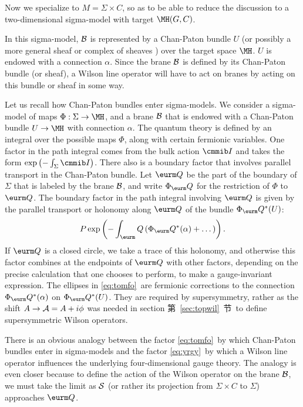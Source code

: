 Now we specialize to $M=\Sigma\times C$, so as to be able to
reduce the discussion to a two-dimensional sigma-model with target
$\MH(G,C)$. 
 
 In this  sigma-model, ${\cal
B}$ is represented by a Chan-Paton bundle $U$ (or possibly a more
general sheaf or complex of sheaves \cite{ref103,ref104}) over
the target space $\MH$. $U$ is endowed with a connection $\alpha$.
Since the brane ${\cal B}$ is defined by its Chan-Paton bundle (or
sheaf), a Wilson line operator will have to act on branes by
acting on this bundle or sheaf in some way.

\def\QQ{\eurm Q}

 Let us recall how Chan-Paton bundles enter sigma-models.  We
consider a sigma-model of maps $\Phi:\Sigma\to \MH$, and a brane
${\cal B}$ that is endowed with a Chan-Paton bundle $U\to \MH$
with connection $\alpha$.   The quantum theory is defined by an
integral over the possible maps $\Phi$, along with certain
fermionic variables. One factor in the path integral comes from
the bulk action ${\cmmib I}$ and takes the form
$\exp\left(-\int_\Sigma {{\cmmib I}}\right)$. There also is a
boundary factor that involves parallel transport in the Chan-Paton
bundle. Let $\QQ$ be the part of the boundary of $\Sigma$ that is
labeled by the brane ${\cal B}$, and write $\Phi_\QQ$ for the
restriction of $\Phi$ to $\QQ$. The boundary factor in the path
integral involving $\QQ$ is given by the parallel transport or
holonomy along $\QQ$ of the bundle $\Phi_\QQ^*(U)$:
\setcounter{equation}{1}
\begin{equation}\label{eq:tomfo}
P\exp\left(-\int_\QQ \left(\Phi_\QQ^*(\alpha)
+\dots\right)\right).
\end{equation}
 If $\QQ$ is a closed circle, we take a
trace of this holonomy, and otherwise this factor combines at the
endpoints of $\QQ$ with other factors, depending on the precise
calculation that one chooses to perform, to make a gauge-invariant
expression. The ellipses in \eqref{eq:tomfo}\ are fermionic corrections to
the connection $\Phi_\QQ^*(\alpha)$ on $\Phi_\QQ^*(U)$.  They are
required by supersymmetry, rather as the shift $A\to {\cal
A}=A+i\phi$ was needed in section 第~\ref{sec:topwil}~节\ to define
supersymmetric Wilson operators.

There is an obvious analogy between the factor \eqref{eq:tomfo}\ by which
Chan-Paton bundles enter in sigma-models and the factor \eqref{eq:yrgy}\ by
which a Wilson line operator influences the underlying
four-dimensional gauge theory.  The analogy is even closer because
to define the action of the Wilson operator on the brane ${\cal
B}$, we must take the limit as ${{\cal S}}$ (or rather its
projection from $\Sigma\times C$ to $\Sigma$) approaches $\QQ$.

